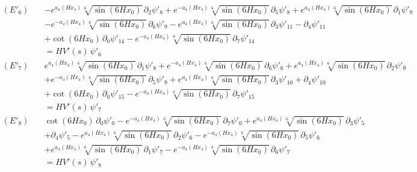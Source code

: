 \begin{align*}
(E'_{6})\quad & -e^{a_4\left(H x_4\right)} \sqrt[6]{\sin \left(6 H x_0\right)}\,\partial_{2}\psi'_{8} + e^{-a_4\left(H x_4\right)} \sqrt[6]{\sin \left(6 H x_0\right)}\,\partial_{5}\psi'_{8} + e^{a_4\left(H x_4\right)} \sqrt[6]{\sin \left(6 H x_0\right)}\,\partial_{1}\psi'_{9} \\
 &  - e^{-a_4\left(H x_4\right)} \sqrt[6]{\sin \left(6 H x_0\right)}\,\partial_{6}\psi'_{9} - e^{a_4\left(H x_4\right)} \sqrt[6]{\sin \left(6 H x_0\right)}\,\partial_{3}\psi'_{11} - \partial_{4}\psi'_{11} \\
 &  + \cot \left(6 H x_0\right)\,\partial_{0}\psi'_{14} - e^{-a_4\left(H x_4\right)} \sqrt[6]{\sin \left(6 H x_0\right)}\,\partial_{7}\psi'_{14} \\
 & = H V'(s)\,\psi'_{6}
\end{align*}
\begin{align*}
(E'_{7})\quad & e^{a_4\left(H x_4\right)} \sqrt[6]{\sin \left(6 H x_0\right)}\,\partial_{1}\psi'_{8} + e^{-a_4\left(H x_4\right)} \sqrt[6]{\sin \left(6 H x_0\right)}\,\partial_{6}\psi'_{8} + e^{a_4\left(H x_4\right)} \sqrt[6]{\sin \left(6 H x_0\right)}\,\partial_{2}\psi'_{9} \\
 &  + e^{-a_4\left(H x_4\right)} \sqrt[6]{\sin \left(6 H x_0\right)}\,\partial_{5}\psi'_{9} + e^{a_4\left(H x_4\right)} \sqrt[6]{\sin \left(6 H x_0\right)}\,\partial_{3}\psi'_{10} + \partial_{4}\psi'_{10} \\
 &  + \cot \left(6 H x_0\right)\,\partial_{0}\psi'_{15} - e^{-a_4\left(H x_4\right)} \sqrt[6]{\sin \left(6 H x_0\right)}\,\partial_{7}\psi'_{15} \\
 & = H V'(s)\,\psi'_{7}
\end{align*}
\begin{align*}
(E'_{8})\quad & \cot \left(6 H x_0\right)\,\partial_{0}\psi'_{0} - e^{-a_4\left(H x_4\right)} \sqrt[6]{\sin \left(6 H x_0\right)}\,\partial_{7}\psi'_{0} + e^{a_4\left(H x_4\right)} \sqrt[6]{\sin \left(6 H x_0\right)}\,\partial_{3}\psi'_{5} \\
 &  + \partial_{4}\psi'_{5} - e^{a_4\left(H x_4\right)} \sqrt[6]{\sin \left(6 H x_0\right)}\,\partial_{2}\psi'_{6} - e^{-a_4\left(H x_4\right)} \sqrt[6]{\sin \left(6 H x_0\right)}\,\partial_{5}\psi'_{6} \\
 &  + e^{a_4\left(H x_4\right)} \sqrt[6]{\sin \left(6 H x_0\right)}\,\partial_{1}\psi'_{7} - e^{-a_4\left(H x_4\right)} \sqrt[6]{\sin \left(6 H x_0\right)}\,\partial_{6}\psi'_{7} \\
 & = H V'(s)\,\psi'_{8}
\end{align*}
